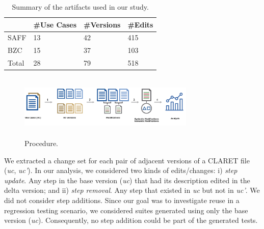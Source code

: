 
\begin{table}[]
\centering
\caption{Summary of the artifacts used in our study.}
\label{tab:useCases}
\begin{tabular}{|l|l|l|l|}
\hline
     & \#Use Cases & \#Versions &\#Edits \\ \hline
SAFF &     13      &      42    &     415         \\ \hline
BZC  &      15     &      37    &     103        \\ \hline
Total  &      28     &      79    &     518         \\ \hline
\end{tabular}
\end{table}


\begin{figure}[h]
\includegraphics[height=1.2in, width=3.3in]{figs/procedure_flow.png}
\caption{Procedure.}
\label{fig: procedure_flow}
\end{figure}

We extracted a change set for each pair of adjacent versions of a CLARET file (\textit{uc}, \textit{uc'}). 
In our analysis, we considered two kinds of edits/changes: i) \textit{step update}. Any step in the base version (\textit{uc}) that had its description edited in the delta version; and ii) \textit{step removal}. Any step that existed in \textit{uc} but not in \textit{uc'}. We did not consider step additions. Since our goal was to investigate reuse in a regression testing scenario, we considered suites generated using only the base version (\textit{uc}). Consequently, no step addition could be part of the generated tests.  

